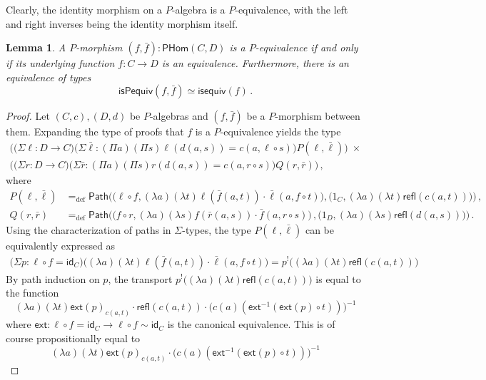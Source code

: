 \documentclass[10pt,a4paper,oneside,reqno]{amsart}
\numberwithin{equation}{section}
\theoremstyle{mythm}
\newtheorem{lemma}[theorem]{Lemma}
\theoremstyle{mydef}
\theoremstyle{myrmk}
\newcommand{\defeq}{=_{\mathrm{def}}}
\newcommand{\co}{\colon}
\newcommand{\idfun}[1]{\mathsf{id}_{#1}}
\newcommand{\comp}{\circ}
\newcommand{\ext}{\mathsf{ext}}
\newcommand{\ct}{\cdot}
\newcommand{\Id}{\mathsf{Path}}
\newcommand{\refl}{\mathsf{refl}}
\newcommand{\WHom}{\mathsf{PHom}}
\begin{document}
Clearly, the identity morphism on a $P$-algebra is a $P$-equivalence, with the left and right inverses being the identity morphism itself.

\begin{lemma}\label{WAlgSpace} A $P$-morphism $(f, \bar{f}) \co \WHom(C,D)$ is a $P$-equivalence if and only
if its underlying function $f \co C \to D$ is an equivalence. Furthermore, there is an equivalence of types
\[
\mathsf{isPequiv}(f, \bar{f})  \simeq \mathsf{isequiv}(f) \, . 
\]
\end{lemma}  
\begin{proof}
Let $(C,c), (D,d)$ be $P$-algebras and $(f, \bar{f})$ be a $P$-morphism between them. Expanding the type of proofs that $f$ is a $P$-equivalence yields the type
\begin{multline*}
 \Big(\big(\Sigma \ell \co D \to  C \big) \big(\Sigma \bar{\ell} : (\Pi a) (\Pi s) \ell(d(a,s))=c(a,\ell \circ s)\big)
P(\ell,\bar{\ell})\Big) \; \times \\ 
 \Big(\big(\Sigma r \co D \to C \big) \big(\Sigma \bar{r} : (\Pi a) (\Pi s) r(d(a,s))=c(a,r \circ s) \big) Q(r,\bar{r})  \Big)\, , 
\end{multline*}
where
\begin{align*}
P(\ell,\bar{\ell}) & \defeq \Id \Big( \big( \ell \comp f, (\lambda a)(\lambda t) \ell(\bar{f}(a,t)) \ct \bar{\ell}(a, f \comp t)\big), \big( 1_C, (\lambda a)(\lambda t) \refl(c(a,t))\big) \Big)  \, , \\
Q(r,\bar{r})    & \defeq \Id \Big( \big( f \comp r, (\lambda a)(\lambda s) f(\bar{r}(a,s)) \ct \bar{f}(a, r \comp s)\big) \, , \big( 1_D, (\lambda a)(\lambda s) \refl(d(a,s)) \big) \Big) \, .
\end{align*}
Using the characterization of paths in $\Sigma$-types, the type $P(\ell,\bar{\ell})$ can be equivalently expressed as
\begin{align*}
\big(\Sigma p : \ell \comp f = \idfun{C} \big) \Big((\lambda a) (\lambda t) \ell(\bar{f}(a,t)) \ct \bar{\ell}(a, f \comp t)\Big) = p^{!} \Big((\lambda a) (\lambda t) \refl(c(a,t))\Big) 
\end{align*}
By path induction on $p$, the transport $p^{!} \Big((\lambda a) (\lambda t) \refl(c(a,t))\Big)$ is equal to the function
\[ (\lambda a) (\lambda t) \ext(p)_{c(a,t)} \ct \refl(c(a,t)) \ct \big(c(a)(\ext^{-1}(\ext(p) \circ t))\big)^{-1} \]
where $\ext : \ell \comp f = \idfun{C} \to \ell \comp f \sim \idfun{C}$ is the canonical equivalence. This is of course propositionally equal to
\[ (\lambda a) (\lambda t) \ext(p)_{c(a,t)} \ct \big(c(a)(\ext^{-1}(\ext(p) \circ t))\big)^{-1} \]

\end{proof}
\end{document}
